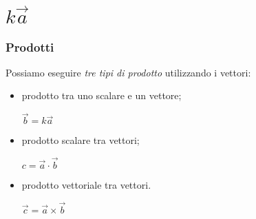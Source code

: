 \documentclass[]{beamer}
\begin{document}
\section{$ k\vec{a} $}

\begin{frame}
  \frametitle{Prodotti}
  Possiamo eseguire \emph{tre tipi di prodotto} utilizzando i vettori:
  \begin{itemize}
    \item prodotto tra uno scalare e un vettore;
    \begin{center}
\colorbox{marroncino!30}{ $ \vec{b} = k\vec{a} $ }
\end{center}\pause
    \item prodotto scalare tra vettori;
    \begin{center}
\colorbox{marroncino!30}{ $ c = \vec{a} \cdot \vec{b} $ }
\end{center}\pause
    \item prodotto vettoriale tra vettori.
    \begin{center}
\colorbox{marroncino!30}{ $ \vec{c} = \vec{a} \times\vec{b} $ }
\end{center}
  \end{itemize}
\end{frame}
\end{document}
